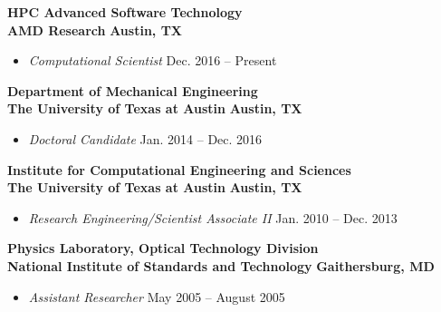 \textbf{HPC Advanced Software Technology}\\
\textbf{AMD Research} \hfill \textbf{Austin, TX}
%
\begin{itemize}
\item[] \textit{Computational Scientist} \hfill
	Dec. 2016 -- Present

\end{itemize}

\blankline


\textbf{Department of Mechanical Engineering}\\
\textbf{The University of Texas at Austin} \hfill \textbf{Austin, TX}
%
\begin{itemize}
\item[] \textit{Doctoral Candidate} \hfill
	Jan. 2014 -- Dec. 2016
\end{itemize}

\blankline

\textbf{Institute for Computational Engineering and Sciences}\\
\textbf{The University of Texas at Austin} \hfill \textbf{Austin, TX}
%
\begin{itemize}
\item[] \textit{Research Engineering/Scientist Associate II} \hfill
	Jan. 2010 -- Dec. 2013
\end{itemize}

\blankline

\textbf{Physics Laboratory, Optical Technology Division}\\
\textbf{National Institute of Standards and Technology} \hfill \textbf{Gaithersburg, MD}
%
\begin{itemize}
\item[] \textit{Assistant Researcher} \hfill
	May 2005 -- August 2005
\end{itemize}